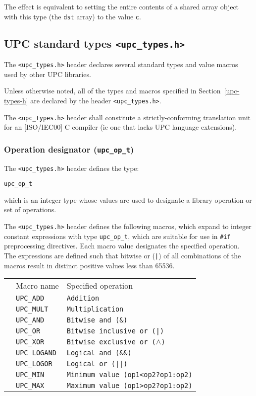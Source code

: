    The effect is equivalent to setting the entire contents of a shared
   array object with this type (the {\tt dst} array) to the value {\tt c}.

\pagebreak
\def\header{{\tt <upc\_types.h>}\xspace}
\newcommand\defmacro[1]{{\tt \quote UPC\_#1\endquote}\index{UPC\_#1}\vspace{-8pt}}
\newcommand\deftype[1]{{\tt \quote #1 \endquote}\index{#1}}
\newcommand\defmacrotab[2]{ & {\tt UPC\_#1}\index{UPC\_#1} & {\tt #2}\\}
\subsection{UPC standard types \header}
\label{upc-types-h}


\npf The \header header declares several standard types and value macros
     used by other UPC libraries.

\np Unless otherwise noted, all of the types and macros
    specified in Section~\ref{upc-types-h}
    are declared by the header \header.

\np The \header header shall constitute a strictly-conforming translation
    unit for an [ISO/IEC00] C compiler (ie one that lacks UPC language extensions).

\subsubsection{Operation designator ({\tt upc\_op\_t})}
\label{upc-op-t}

\npf The \header header defines the type:

\deftype{upc\_op\_t}

which is an integer type whose values are used to designate a library operation 
or set of operations.

\np The \header header defines the following macros, 
which expand to integer constant expressions with type {\tt upc\_op\_t},
which are suitable for use in {\tt \#if} preprocessing directives. 
Each macro value designates the specified operation.
The expressions are defined such that bitwise or ({\tt |}) of all combinations 
of the macros result in distinct positive values less than 65536.
\begin{tabular}{ p{30pt} l l }
& Macro name & Specified operation\\
\cline{2-3}
\defmacrotab{ADD}	{Addition}
\defmacrotab{MULT}	{Multiplication}
\defmacrotab{AND}	{Bitwise and ({\tt \&})}
\defmacrotab{OR}	{Bitwise inclusive or ({\tt |})}
\defmacrotab{XOR}	{Bitwise exclusive or ({\tt $\wedge$})}
\defmacrotab{LOGAND}	{Logical and ({\tt \&\&})}
\defmacrotab{LOGOR}	{Logical or ({\tt ||})}
\defmacrotab{MIN}	{Minimum value ({\tt op1<op2?op1:op2})}
\defmacrotab{MAX}	{Maximum value ({\tt op1>op2?op1:op2})}
\end{tabular}

